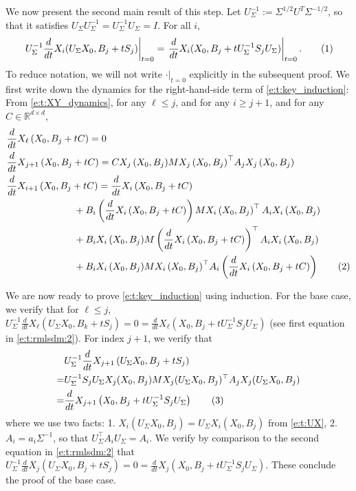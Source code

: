 \documentclass{article}
\newcommand{\R}{\mathbb{R}}
\newcommand*\lrp[1]{\left( #1 \right)}
\newcommand\numberthis{\addtocounter{equation}{1}\tag{\theequation}}
\newcommand*\at[2]{\left.#1\right|_{#2}}
\newcommand{\US}{U_\Sigma}
\begin{document}
We now present the second main result of this step. Let $\US^{-1} := \Sigma^{1/2} U^T \Sigma^{-1/2}$, so that it satisfies $\US \US^{-1}= \US^{-1} \US = I$. For all $i$,
\begin{align*}
\at{\US^{-1} \frac{d}{dt} X_i(\US X_0, B_j + t S_j)}{t=0} = \at{\frac{d}{dt} X_i(X_0, B_j + t \US^{-1} S_j \US)}{t=0}.
\numberthis \label{e:t:key_induction}
\end{align*}
To reduce notation, we will not write $\at{\cdot}{t=0}$ explicitly in the subsequent proof. We first write down the dynamics for the right-hand-side term of \eqref{e:t:key_induction}:
From \eqref{e:t:XY_dynamics}, for any $\ell \leq j$, and for any $i \geq j+1$, and for any $C\in \R^{d\times d}$,
\begin{align*}
& \frac{d}{dt} X_{\ell} \lrp{X_0, B_j + t C} = 0\\
& \frac{d}{dt} X_{j+1} \lrp{X_0, B_j + t C} = C {X_{j}\lrp{X_0, B_j}} M {X_{j}\lrp{X_0, B_j}}^{\top} A_j  {X_{j}\lrp{X_0, B_j}}\\
& \frac{d}{dt} X_{i+1} \lrp{X_0, B_j + t C}
= \frac{d}{dt} X_{i} \lrp{X_0, B_j + t C}\\
&\qquad\qquad\qquad\quad + B_i \lrp{\frac{d}{dt} X_{i}\lrp{X_0, B_j + t C}} M X_{i}\lrp{X_0, B_j}^{\top} A_i  X_{i}\lrp{X_0, B_j}\\
&\qquad\qquad\qquad\quad + B_i {X_{i}\lrp{X_0, B_j}} M \lrp{\frac{d}{dt} X_{i}\lrp{X_0, B_j + tC}}^{\top} A_i  X_{i}\lrp{X_0, B_j}\\
&\qquad\qquad\qquad\quad + B_i {X_{i}\lrp{X_0, B_j}} M {X_{i}\lrp{X_0, B_j}}^{\top} A_i  \lrp{\frac{d}{dt}X_{i}\lrp{X_0, B_j+tC}}
\numberthis \label{e:t:rmlsdm:2}
\end{align*}


We are now ready to prove \eqref{e:t:key_induction} using induction. For the base case, we verify that for $\ell \leq j$, $\US^{-1} \frac{d}{dt} X_{\ell} \lrp{\US X_0, B_k + tS_j} = 0 = \frac{d}{dt} X_{\ell} \lrp{X_0, B_j + t\US^{-1} S_j \US}$ (see first equation in \eqref{e:t:rmlsdm:2}). For index $j+1$, we verify that
\begin{align*}
& \US^{-1} \frac{d}{dt} X_{j+1} \lrp{\US X_0, B_j + t S_j} \\
=& \US^{-1} S_j \US X_j( X_0, B_j) M X_j(\US X_0, B_j)^\top A_j X_j(\US X_0, B_j)\\
=& \frac{d}{dt} X_{j+1} \lrp{X_0, B_j + t \US^{-1} S_j \US}
\numberthis \label{e:t:rmlsdm:4}
\end{align*}
where we use two facts:  1. $X_i(\US X_0, B_j) = \US X_i(X_0, B_j)$ from \eqref{e:t:UX}, 2. $A_i = a_i \Sigma^{-1}$, so that $\US^{\top} A_i \US = A_i$. We verify by comparison to the second equation in \eqref{e:t:rmlsdm:2} that $\US^{-1} \frac{d}{dt} X_{j} \lrp{\US X_0, B_j + tS_j} = 0 = \frac{d}{dt} X_{j} \lrp{X_0, B_j + t\US^{-1} S_j \US}$. These conclude the proof of the base case.
\end{document}

